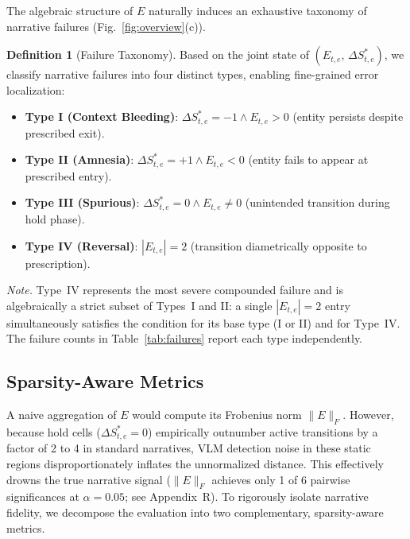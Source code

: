 \documentclass[sigconf,review,anonymous]{acmart}
\theoremstyle{definition}
\newtheorem{definition}{Definition}[section]
\begin{document}
The algebraic structure of $E$ naturally induces an exhaustive taxonomy of narrative failures (Fig.~\ref{fig:overview}(c)).

\begin{definition}[Failure Taxonomy]
\label{def:failure_taxonomy}
Based on the joint state of $(E_{t,e},\, \Delta S^*_{t,e})$, we classify narrative failures into four distinct types, enabling fine-grained error localization:

\begin{itemize}[leftmargin=*, labelsep=0.5em, itemsep=2pt]
  \item \textbf{Type I (Context Bleeding)}: $\Delta S^*_{t,e} = -1 \land E_{t,e} > 0$ (entity persists despite prescribed exit).
  \item \textbf{Type II (Amnesia)}: $\Delta S^*_{t,e} = +1 \land E_{t,e} < 0$ (entity fails to appear at prescribed entry).
  \item \textbf{Type III (Spurious)}: $\Delta S^*_{t,e} = 0 \land E_{t,e} \neq 0$ (unintended transition during hold phase).
  \item \textbf{Type IV (Reversal)}: $|E_{t,e}| = 2$ (transition diametrically opposite to prescription).
\end{itemize}
\end{definition}

\noindent\emph{Note.}\; Type~IV represents the most severe compounded failure and is algebraically a strict subset of Types~I and II: a single $|E_{t,e}| = 2$ entry simultaneously satisfies the condition for its base type (I or II) and for Type~IV. The failure counts in Table~\ref{tab:failures} report each type independently.

\subsection{Sparsity-Aware Metrics}
\label{sec:metrics}

A naive aggregation of $E$ would compute its Frobenius norm $\lVert E \rVert_F$. However, because hold cells ($\Delta S^*_{t,e} = 0$) empirically outnumber active transitions by a factor of 2 to 4 in standard narratives, VLM detection noise in these static regions disproportionately inflates the unnormalized distance. This effectively drowns the true narrative signal ($\lVert E \rVert_F$ achieves only 1 of 6 pairwise significances at $\alpha = 0.05$; see Appendix~R). To rigorously isolate narrative fidelity, we decompose the evaluation into two complementary, sparsity-aware metrics.
\end{document}
